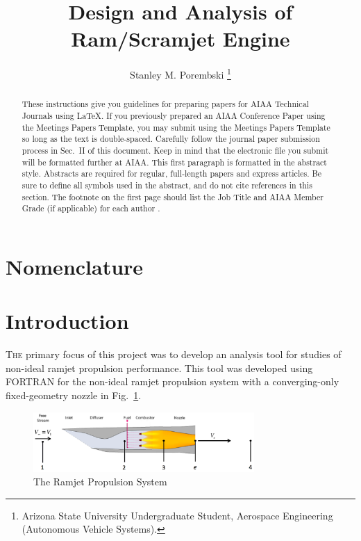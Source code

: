 \documentclass[conf]{new-aiaa} %
\title{Design and Analysis of Ram/Scramjet Engine}
\author{Stanley M. Porembski \footnote{Arizona State University Undergraduate Student, Aerospace Engineering (Autonomous Vehicle Systems).}}
\affil{Arizona State University Ira A. Schools of Engineering, Tempe, AZ, 85281}
\begin{document}
\maketitle

\begin{abstract}
These instructions give you guidelines for preparing papers for AIAA Technical Journals using \LaTeX{}. If you previously prepared an AIAA Conference Paper using the Meetings Papers Template, you may submit using the Meetings Papers Template so long as the text is double-spaced.  Carefully follow the journal paper submission process in Sec.~II of this document. Keep in mind that the electronic file you submit will be formatted further at AIAA. This first paragraph is formatted in the abstract style. Abstracts are required for regular, full-length papers and express articles. Be sure to define all symbols used in the abstract, and do not cite references in this section. The footnote on the first page should list the Job Title and AIAA Member Grade (if applicable) for each author \cite{porembski2024github}.
\end{abstract}


\section*{Nomenclature}




\section{Introduction}
\lettrine{T}{he} primary focus of this project was to develop an analysis tool for studies of non-ideal ramjet propulsion performance. This tool was developed using FORTRAN for the non-ideal ramjet propulsion system with a converging-only fixed-geometry nozzle in Fig.~\ref{fig:propsys}.

\begin{figure}[hbt!] %
    \centering
    \includegraphics[width=0.75\textwidth]{media/the_ramjet.png}
    \caption{\label{fig:propsys} The Ramjet Propulsion System}
\end{figure}
\end{document}
